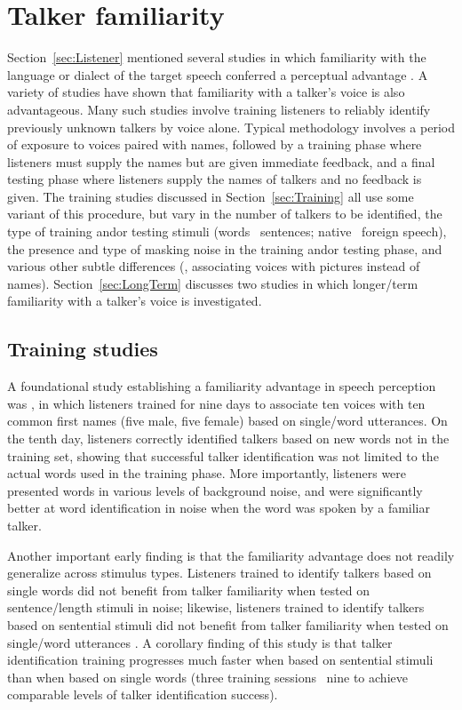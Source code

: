 \section{Talker familiarity\label{sec:Fam}}
Section~\ref{sec:Listener} mentioned several studies in which familiarity with the language or dialect of the target speech conferred a perceptual advantage \citep[\eg,][]{BentBradlow2003, ImaiEtAl2005, PinetEtAl2011}.  A variety of studies have shown that familiarity with a talker’s voice is also advantageous.  Many such studies involve training listeners to reliably identify previously unknown talkers by voice alone.  Typical methodology involves a period of exposure to voices paired with names, followed by a training phase where listeners must supply the names but are given immediate feedback, and a final testing phase where listeners supply the names of talkers and no feedback is given.  The training studies discussed in Section~\ref{sec:Training} all use some variant of this procedure, but vary in the number of talkers to be identified, the type of training and\slsh or testing stimuli (words \vs\ sentences; native \vs\ foreign speech), the presence and type of masking noise in the training and\slsh or testing phase, and various other subtle differences (\eg, associating voices with pictures instead of names).  Section~\ref{sec:LongTerm} discusses two studies in which longer\-/term familiarity with a talker’s voice is investigated.

\subsection{Training studies\label{sec:Training}}
A foundational study establishing a familiarity advantage in speech perception was \citet{NygaardEtAl1994}, in which listeners trained for nine days to associate ten voices with ten common first names (five male, five female) based on single\-/word utterances.  On the tenth day, listeners correctly identified talkers based on new words not in the training set, showing that successful talker identification was not limited to the actual words used in the training phase.  More importantly, listeners were presented words in various levels of background noise, and were significantly better at word identification in noise when the word was spoken by a familiar talker.

Another important early finding is that the familiarity advantage does not readily generalize across stimulus types.  Listeners trained to identify talkers based on single words did not benefit from talker familiarity when tested on sentence\-/length stimuli in noise; likewise, listeners trained to identify talkers based on sentential stimuli did not benefit from talker familiarity when tested on single\-/word utterances \citep{NygaardPisoni1998, YonanSommers2000}.  A corollary finding of this study is that talker identification training progresses much faster when based on sentential stimuli than when based on single words (three training sessions \vs\ nine to achieve comparable levels of talker identification success).     

